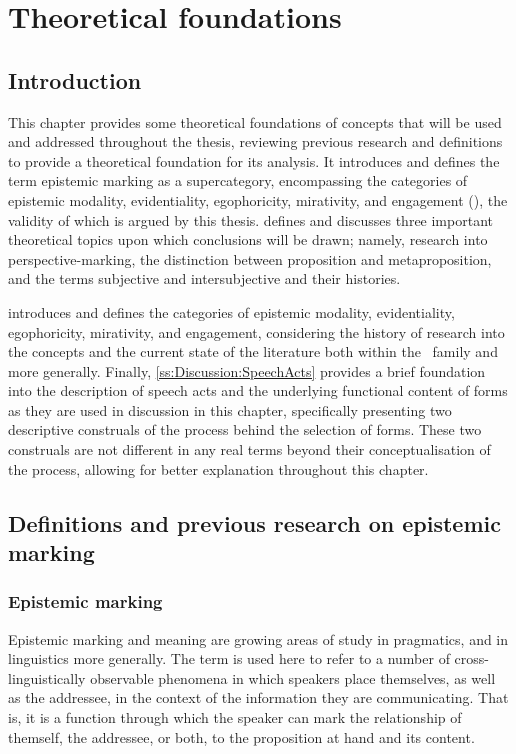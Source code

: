 \chapter{Theoretical foundations}\label{c:Foundations}
\section{Introduction}
This chapter provides some theoretical foundations of concepts that will be used and addressed throughout the thesis, reviewing previous research and definitions to provide a theoretical foundation for its analysis. It introduces and defines the term epistemic marking as a supercategory, encompassing the categories of epistemic modality, evidentiality, egophoricity, mirativity, and engagement (), the validity of which is argued by this thesis.  defines and discusses three important theoretical topics upon which conclusions will be drawn; namely, research into perspective-marking, the distinction between proposition and metaproposition, and the terms subjective and intersubjective and their histories.

 introduces and defines the categories of epistemic modality, evidentiality, egophoricity, mirativity, and engagement, considering the history of research into the concepts and the current state of the literature both within the \lfam\ family and more generally. Finally, \ref{ss:Discussion:SpeechActs} provides a brief foundation into the description of speech acts and the underlying functional content of forms as they are used in discussion in this chapter, specifically presenting two descriptive construals of the process behind the selection of forms. These two construals are not different in any real terms beyond their conceptualisation of the process, allowing for better explanation throughout this chapter.

\section{Definitions and previous research on epistemic marking}\label{s:Intro:EpistemicIntro}
\subsection{Epistemic marking}
Epistemic marking and meaning are growing areas of study in pragmatics, and in linguistics more generally. The term is used here to refer to a number of cross-linguistically observable phenomena in which speakers place themselves, as well as the addressee, in the context of the information they are communicating. That is, it is a function through which the speaker can mark the relationship of themself, the addressee, or both, to the proposition at hand and its content. 

